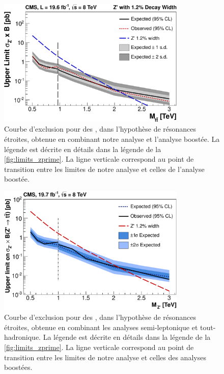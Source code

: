 \medskip

\begin{figure}[p]
  \centering
  \includegraphics[width=0.80\textwidth]{chapitre7/figs/limits_narrow_combined.pdf}
  \caption{Courbe d'exclusion pour des \zprime, dans l'hypothèse de résonances étroites, obtenue en combinant notre analyse et l'analyse boostée. La légende est décrite en détails dans la légende de la \cref{fig:limits_zprime}. La ligne verticale correspond au point de transition entre les limites de notre analyse et celles de l'analyse boostée.}
  \label{fig:limits_narrow_cms}
\end{figure}

\begin{figure}[p]
  \centering
  \includegraphics[width=0.80\textwidth]{chapitre7/figs/limits_narrow_full_comb.pdf}
  \caption{Courbe d'exclusion pour des \zprime, dans l'hypothèse de résonances étroites, obtenue en combinant les analyses semi-leptonique et tout-hadronique. La légende est décrite en détails dans la légende de la \cref{fig:limits_zprime}. La ligne verticale correspond au point de transition entre les limites de notre analyse et celles des analyses boostées.}
  \label{fig:limits_narrow_cms_full}
\end{figure}

